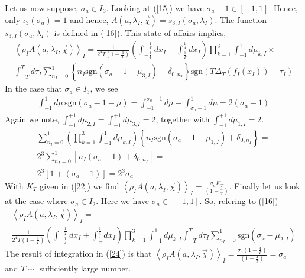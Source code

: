 \documentclass{appolb}
\newcommand{\sgn}{\text{sgn}}
\begin{document}
Let us now suppose, $\sigma_a \in I_3$.  Looking at (\ref{15}) we have $\sigma_a - 1 \in [-1,1]$. 
Hence, only $\iota_3(\sigma_a)=1$ and hence, $A(a,\lambda_I,\vec{\chi})=s_{3,I}(\sigma_a,\lambda_{I})$.  The function $s_{3,I}(\sigma_a,\lambda_{I})$ is defined in (\ref{16}). This state of affairs implies,
\begin{eqnarray}\label{23}
\left \langle \rho_{I} A(a,\lambda_{I},\vec{\chi})\right\rangle_{I} = \frac{1}{2^4T(1-\frac{4}{T})}\left( \int_{-\frac{1}{4}}^{-\frac{1}{T}} d x_{I} + \int_{\frac{1}{T}}^{\frac{1}{4}} d x_{I}\right)\prod_{k=1}^3 \int_{-1}^1 d\mu_{k,I}\times\nonumber\\
\int_{-T}^{T} d\tau_{I} \sum_{n_{I}=0}^1 \left\{n_{I}\sgn\left(\sigma_a-1-\mu_{3,I} \right)+\delta_{0,n_{I}} \right\}\sgn \left( T\Delta_T(f_{I}(x_{I}))-\tau_{I} \right)
\end{eqnarray}
In the case that $\sigma_a \in I_3$, we see
\begin{eqnarray}\label{23a}
\int_{-1}^1 d\mu \,\sgn\left(\sigma_a - 1 - \mu\right) =\int_{-1}^{\sigma_a-1 } d\mu- \int_{\sigma_a - 1}^1 d\mu = 2\left(\sigma_a-1\right) 
\end{eqnarray}
Again we note, $\int_{-1}^{+1 } d\mu_{2,I}=\int_{-1}^{+1 } d\mu_{3,I}=2$, together with $\int_{-1}^{+1 } d\mu_{1,I}=2$.
\begin{eqnarray}\label{23b}
 \sum_{n_{I}=0}^1\left(\prod_{k=1}^3 \int_{-1}^1 d\mu_{k,I}\right) \left\{n_{I}\sgn\left(\sigma_a-1-\mu_{1,I} \right)+\delta_{0,n_{I}} \right\} =
\nonumber\\
 2^3  \sum_{n_{I}=0}^1 \left[  n_{I}(\sigma_a-1)+\delta_{0,n_{I}}\right]=\nonumber\\
2^3[1+(\sigma_a-1)]=2^3 \sigma_a
\end{eqnarray}
With $K_T$ given in (\ref{22}) we find 
$\left \langle \rho_{I} A(a,\lambda_{I},\vec{\chi})\right\rangle_{I}=\frac{\sigma_a K_T}{\left(1-\frac{4}{T}\right)}$. 
\newpage
Finally let us look at the case where $\sigma_a \in I_2$. Here we have $\sigma_a \in [-1,1]$. 
So, refering to (\ref{16})
\begin{eqnarray}\label{24}
\left \langle \rho_{I} A(a,\lambda_{I},\vec{\chi})\right\rangle_{I} = 
\nonumber\\
\frac{1}{2^4T(1-\frac{4}{T})}\left( \int_{-\frac{1}{4}}^{-\frac{1}{T}} d x_{I} + \int_{\frac{1}{T}}^{\frac{1}{4}} d x_{I}\right)\prod_{k=1}^3 \int_{-1}^1 d\mu_{k,I}
\int_{-T}^{T} d\tau_{I} \sum_{n_{I}=0}^1 \sgn\left(\sigma_a - \mu_{2,I}\right)
\end{eqnarray}
The result of integration in (\ref{24}) is that  $\left \langle \rho_{I} A(a,\lambda_{I},\vec{\chi})\right\rangle_{I}=\frac{\sigma_a \left(1-\frac{4}{T}\right)}{\left(1-\frac{4}{T}\right)}= \sigma_a$ and $T \sim $ sufficiently large number.
\end{document}
